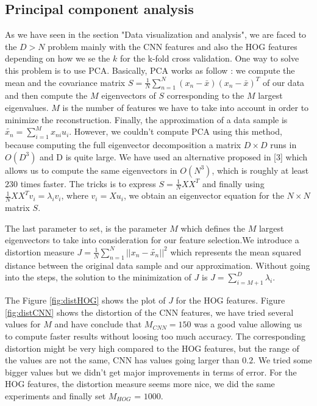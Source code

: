 \documentclass{article} %
\begin{document}
\subsection{Principal component analysis}

As we have seen in the section "Data visualization and analysis", we are faced to the $D > N$ problem mainly with the CNN features and also the HOG features depending on how we se the $k$ for the k-fold cross validation. One way to solve this problem is to use PCA.  Basically, PCA works as follow : we compute the mean and the covariance matrix $S = \frac{1}{N}\sum_{n=1}^{N}(x_n-\bar{x})(x_n-\bar{x})^T$ of our data and then compute the $M$ eigenvectors of $S$ corresponding to the $M$ largest eigenvalues. $M$ is the number of features we have to take into account in order to minimize the reconstruction. Finally, the approximation of a data sample is $\tilde{x_n} = \sum_{i=1}^M x_{ni} u_i$. However, we couldn't compute PCA using this method, because computing the full eigenvector decomposition a matrix $D \times D$ runs in  $O(D^3)$ and D is quite large. 
We have used an alternative proposed in [3] which allows us to compute the same eigenvectors in $O(N^3)$, which is roughly at least $230$ times faster. The tricks is to express $S = \frac{1}{N}XX^T$ and finally using $\frac{1}{N}XX^Tv_i = \lambda_i v_i$, where $v_i=Xu_i$, we obtain an eigenvector equation for the $N \times N$ matrix $S$.

The last parameter to set, is the parameter $M$ which defines the $M$ largest eigenvectors to take into consideration for our feature selection.We introduce a distortion measure $J = \frac{1}{N}\sum_{n=1}^{N}||x_n-\tilde{x_n}||^2$ which represents the mean squared distance between the original data sample and our approximation. Without going into the steps, the solution to the minimization of $J$ is $J = \sum_{i=M+1}^D \lambda_i$. 


The Figure \ref{fig:distHOG} shows the plot of $J$ for the HOG features. Figure \ref{fig:distCNN} shows the distortion of the CNN features, we have tried several values for $M$ and have conclude that $M_{CNN} = 150$ was a good value allowing us to compute faster results without loosing too much accuracy. The corresponding distortion might be very high compared to the HOG features, but the range of the values are not the same, CNN has values going larger than $0.2$. We tried some bigger values but we didn't get major improvements in terms of error. For the HOG features, the distortion measure seems more nice, we did the same experiments and finally set $M_{HOG}$ = $1000$. 
\end{document}
